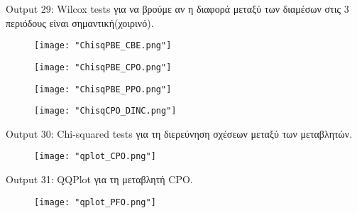\documentclass[10pt]{article}
\begin{document}
\begin{centering}


\renewcommand{\caption}{Output 29: }
\caption { Wilcox tests για να βρούμε αν η διαφορά μεταξύ των διαμέσων στις 3 περιόδους είναι σημαντική(χοιρινό). }
\end{centering}

\begin{figure}[H]
    \centering
    \texttt{[image: "ChisqPBE\_CBE.png"]}
    
    \label{fig:galaxy}
\end{figure}

\begin{figure}[H]
    \centering
    \texttt{[image: "ChisqPBE\_CPO.png"]}
    
    \label{fig:galaxy}
\end{figure}

\begin{figure}[H]
    \centering
    \texttt{[image: "ChisqPBE\_PPO.png"]}
    
    \label{fig:galaxy}
\end{figure}

\begin{figure}[H]
    \centering
    \texttt{[image: "ChisqCPO\_DINC.png"]}
    
    \label{fig:galaxy}
\end{figure}

\begin{centering}


\renewcommand{\caption}{Output 30: }
\caption { Chi-squared tests για τη διερεύνηση σχέσεων μεταξύ των μεταβλητών. }
\end{centering}

\begin{figure}[H]
    \centering
    \texttt{[image: "qplot\_CPO.png"]}
    
    \label{fig:galaxy}
\end{figure}

\begin{centering}


\renewcommand{\caption}{Output 31: }
\caption { QQPlot για τη μεταβλητή CPO. }
\end{centering}

\begin{figure}[H]
    \centering
    \texttt{[image: "qplot\_PFO.png"]}
    
    \label{fig:galaxy}
\end{figure}
\end{document}
